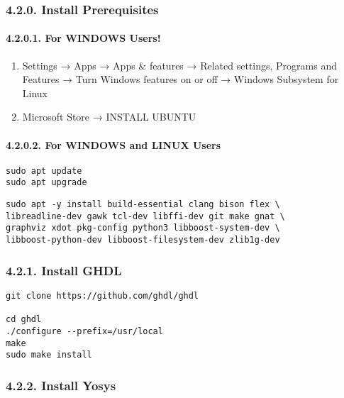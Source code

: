\documentclass[]{article}
\let\oldparagraph\paragraph
\renewcommand{\paragraph}[1]{\oldparagraph{#1}\mbox{}}
\begin{document}
\subsubsection{4.2.0. Install
Prerequisites}\label{install-prerequisites-1}

\paragraph{4.2.0.1. For WINDOWS Users!}\label{for-windows-users}

\begin{enumerate}
\def\labelenumi{\arabic{enumi}.}
\item
  Settings → Apps → Apps \& features → Related settings, Programs and
  Features → Turn Windows features on or off → Windows Subsystem for
  Linux
\item
  Microsoft Store → INSTALL UBUNTU
\end{enumerate}

\paragraph{4.2.0.2. For WINDOWS and LINUX
Users}\label{for-windows-and-linux-users}

\begin{verbatim}
sudo apt update
sudo apt upgrade
\end{verbatim}

\begin{verbatim}
sudo apt -y install build-essential clang bison flex \
libreadline-dev gawk tcl-dev libffi-dev git make gnat \
graphviz xdot pkg-config python3 libboost-system-dev \
libboost-python-dev libboost-filesystem-dev zlib1g-dev
\end{verbatim}

\subsubsection{4.2.1. Install GHDL}\label{install-ghdl}

\begin{verbatim}
git clone https://github.com/ghdl/ghdl

cd ghdl
./configure --prefix=/usr/local
make
sudo make install
\end{verbatim}

\subsubsection{4.2.2. Install Yosys}\label{install-yosys}
\end{document}
